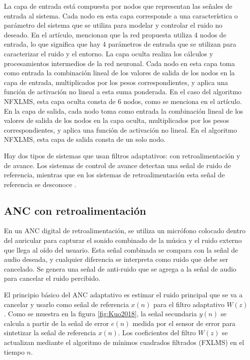 \documentclass[a4paper,12pt]{article}
\begin{document}
La capa de entrada está compuesta por nodos que representan las señales de entrada al sistema.
Cada nodo en esta capa corresponde a una característica o parámetro del sistema que se utiliza para modelar y controlar el ruido no deseado.
En el artículo, mencionan que la red propuesta utiliza 4 nodos de entrada, lo que significa que hay 4 parámetros de entrada que se utilizan para caracterizar el ruido y el entorno.
La capa oculta realiza los cálculos y procesamientos intermedios de la red neuronal.
Cada nodo en esta capa toma como entrada la combinación lineal de los valores de salida de los nodos en la capa de entrada, multiplicados por los pesos correspondientes, y aplica una función de activación no lineal a esta suma ponderada.
En el caso del algoritmo NFXLMS, esta capa oculta consta de 6 nodos, como se menciona en el artículo.
En la capa de salida, cada nodo toma como entrada la combinación lineal de los valores de salida de los nodos en la capa oculta, multiplicados por los pesos correspondientes, y aplica una función de activación no lineal.
En el algoritmo NFXLMS, esta capa de salida consta de un solo nodo.

Hay dos tipos de sistemas que usan filtros adaptativos: con retroalimentación y de avance.
Los sistemas de control de avance detectan una señal de ruido de referencia, mientras que en los sistemas de retroalimentación esta señal de referencia se desconoce \parencite{Salmasi2011}.

\subsection{ANC con retroalimentación}

En un ANC digital de retroalimentación, se utiliza un micrófono colocado dentro del auricular para capturar el sonido combinado de la música y el ruido externo que llega al oído del usuario.
Esta señal combinada se compara con la señal de audio deseada, y cualquier diferencia se interpreta como ruido que debe ser cancelado.
Se genera una señal de anti-ruido que se agrega a la señal de audio para cancelar el ruido percibido.

El principio básico del ANC adaptativo es estimar el ruido principal que se va a cancelar y usarlo como señal de referencia $x(n)$ para el filtro adaptativo $W(z)$.
Como se muestra en la figura \ref{fig:Kuo2018}, la señal secundaria $y(n)$ se calcula a partir de la señal de error $e(n)$ medida por el sensor de error para sintetizar la señal de referencia $x(n)$.
Los coeficientes del filtro $W(z)$ se actualizan mediante el algoritmo de mínimos cuadrados filtrados (FXLMS) en el tiempo $n$.
\end{document}

